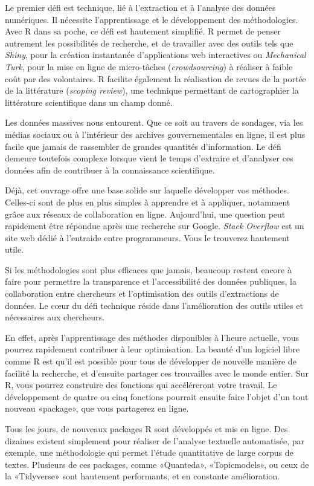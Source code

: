 \documentclass[
  letterpaper,
  DIV=11,
  numbers=noendperiod]{scrreprt}
\begin{document}
Le premier défi est technique, lié à l'extraction et à l'analyse des
données numériques. Il nécessite l'apprentissage et le développement des
méthodologies. Avec R dans sa poche, ce défi est hautement simplifié. R
permet de penser autrement les possibilités de recherche, et de
travailler avec des outils tels que \emph{Shiny}, pour la création
instantanée d'applications web interactives ou \emph{Mechanical Turk},
pour la mise en ligne de micro-tâches (\emph{crowdsourcing}) à réaliser
à faible coût par des volontaires. R facilite également la réalisation
de revues de la portée de la littérature (\emph{scoping review}), une
technique permettant de cartographier la littérature scientifique dans
un champ donné.

Les données massives nous entourent. Que ce soit au travers de sondages,
via les médias sociaux ou à l'intérieur des archives gouvernementales en
ligne, il est plus facile que jamais de rassembler de grandes quantités
d'information. Le défi demeure toutefois complexe lorsque vient le temps
d'extraire et d'analyser ces données afin de contribuer à la
connaissance scientifique.

Déjà, cet ouvrage offre une base solide sur laquelle développer vos
méthodes. Celles-ci sont de plus en plus simples à apprendre et à
appliquer, notamment grâce aux réseaux de collaboration en ligne.
Aujourd'hui, une question peut rapidement être répondue après une
recherche sur Google. \emph{Stack Overflow} est un site web dédié à
l'entraide entre programmeurs. Vous le trouverez hautement utile.

Si les méthodologies sont plus efficaces que jamais, beaucoup restent
encore à faire pour permettre la transparence et l'accessibilité des
données publiques, la collaboration entre chercheurs et l'optimisation
des outils d'extractions de données. Le cœur du défi technique réside
dans l'amélioration des outils utiles et nécessaires aux chercheurs.

En effet, après l'apprentissage des méthodes disponibles à l'heure
actuelle, vous pourrez rapidement contribuer à leur optimisation. La
beauté d'un logiciel libre comme R est qu'il est possible pour tous de
développer de nouvelle manière de facilité la recherche, et d'ensuite
partager ces trouvailles avec le monde entier. Sur R, vous pourrez
construire des fonctions qui accéléreront votre travail. Le
développement de quatre ou cinq fonctions pourrait ensuite faire l'objet
d'un tout nouveau «package», que vous partagerez en ligne.

Tous les jours, de nouveaux packages R sont développés et mis en ligne.
Des dizaines existent simplement pour réaliser de l'analyse textuelle
automatisée, par exemple, une méthodologie qui permet l'étude
quantitative de large corpus de textes. Plusieurs de ces packages, comme
«Quanteda», «Topicmodels», ou ceux de la «Tidyverse» sont hautement
performants, et en constante amélioration.
\end{document}
